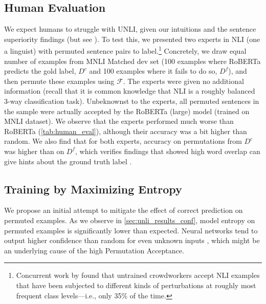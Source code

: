 \documentclass[letterpaper, 12pt]{report}
\newcommand{\PermAcc}{Permutation Acceptance} %
\begin{document}

\subsection{Human Evaluation}
\label{sec:unli_human_eval}

We expect humans to struggle with UNLI, given our intuitions and the sentence superiority findings (but see \citealt{mollica-2020-composition}). To test this, we presented two experts in NLI (one a linguist) with permuted sentence pairs to label.\footnote{Concurrent work by \cite{gupta-etal-2021-bert} found that untrained crowdworkers accept NLI examples that have been subjected to different kinds of perturbations at roughly most frequent class levels---i.e., only 35\% of the time.} Concretely, we draw equal number of examples from MNLI Matched dev set (100 examples where RoBERTa predicts the gold label, $D^c$ and 100 examples where it fails to do so, $D^f$), and then permute these examples using $\mathcal{F}$. The experts were given no additional information (recall that it is common knowledge that NLI is a roughly balanced 3-way classification task). Unbeknownst to the experts, all permuted sentences in the sample were actually accepted by the RoBERTa (large) model (trained on MNLI dataset). We observe that the experts performed much worse than RoBERTa (\autoref{tab:human_eval}), although their accuracy was a bit higher than random. We also find that for both experts, accuracy on permutations from $D^c$ was higher than on $D^f$, which verifies findings that showed high word overlap can give hints about the ground truth label \citep{dasgupta-etal-2018-evaluating, poliak-etal-2018-hypothesis, gururangan-etal-2018-annotation, naik-etal-2019-exploring}.



\subsection{Training by Maximizing Entropy}
\label{sec:unli_training}

We propose an initial attempt to mitigate the effect of correct prediction on permuted examples. As we observe in \autoref{sec:unli_results_conf}, model entropy on permuted examples is significantly lower than expected.
Neural networks tend to output higher confidence than random for even unknown inputs \cite{gandhi2019mutual}, which might be an underlying cause of the high \PermAcc.
\end{document}
